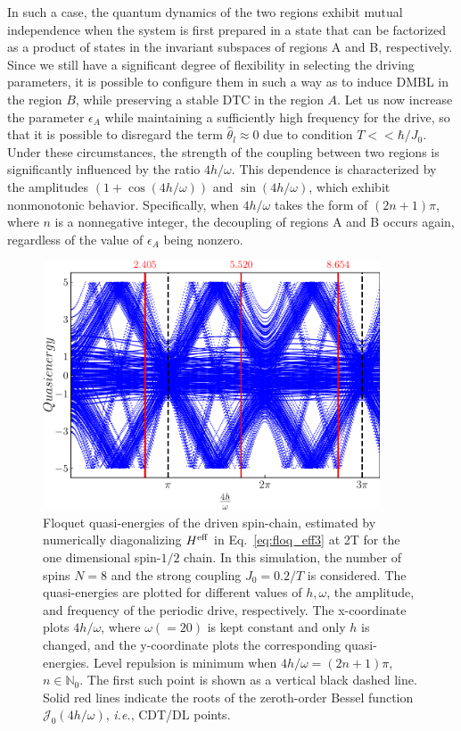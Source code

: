 \documentclass[12pt]{iopart}
\begin{document}
In such a case, the quantum dynamics of the two regions exhibit mutual independence when the system is first prepared in a state that can be factorized as a product of states in the invariant subspaces of regions A and B, respectively. Since we still have a significant degree of flexibility in selecting the driving parameters, it is possible to configure them in such a way as to induce DMBL in the region $B$, while preserving a stable DTC in the region $A$. Let us now increase the parameter $\epsilon_A$ while maintaining a sufficiently high frequency for the drive, so that it is possible to disregard the term $\hat{\theta}_l \approx 0$ due to condition $T<<\hbar/J_0$. Under these circumstances, the strength of the coupling between two regions is significantly influenced by the ratio $4h/\omega$. This dependence is characterized by the amplitudes $(1+\cos(4h/\omega))$ and $\sin(4h/\omega)$, which exhibit nonmonotonic behavior. Specifically, when $4h/\omega$ takes the form of $(2n+1)\pi$, where $n$ is a nonnegative integer, the decoupling of regions A and B occurs again, regardless of the value of $\epsilon_A$ being nonzero.
\begin{figure}[h!]
    \centering
    \includegraphics[width=10cm]{quasienergy_8_lowres.pdf}
    \caption{Floquet quasi-energies of the driven spin-chain,  estimated by numerically diagonalizing $H^{\rm eff}$ in Eq.~\eqref{eq:floq_eff3} at 2T for the one dimensional spin-$1/2$ chain. In this simulation, the number of spins $N=8$ and the strong coupling $J_0=0.2/T$ is considered. The quasi-energies are plotted for different values of $h,\omega$, the amplitude, and frequency of the periodic drive, respectively.  The x-coordinate plots ${4h}/{\omega}$, where $\omega( = 20)$ is kept constant and only $h$ is changed, and the y-coordinate plots the corresponding quasi-energies. Level repulsion is minimum when ${4h}/{\omega} = (2n+1)\pi$, $n\in \mathbb{N}_0$. The first such point is shown as a vertical black dashed line. Solid red lines indicate the roots of the zeroth-order Bessel function $\mathcal{J}_0(4h/\omega)$, \textit{i.e.}, CDT/DL points.}
    \label{Fig:quasienergy_new}
\end{figure}	
\end{document}
